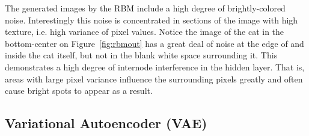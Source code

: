 \documentclass[%
 reprint,
 amsmath,amssymb,
 aps,
]{revtex4-2}
\begin{document}
The generated images by the RBM include a high degree of brightly-colored noise. Interestingly this noise is concentrated in sections of the image with high texture, i.e. high variance of pixel values. Notice the image of the cat in the bottom-center on Figure~\ref{fig:rbmout} has a great deal of noise at the edge of and inside the cat itself, but not in the blank white space surrounding it. This demonstrates a high degree of internode interference in the hidden layer. That is, areas with large pixel variance influence the surrounding pixels greatly and often cause bright spots to appear as a result.

\subsection{Variational Autoencoder (VAE)}
\end{document}
